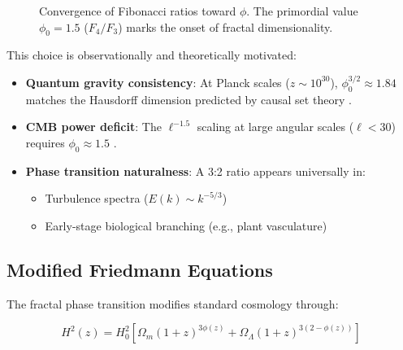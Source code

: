 \documentclass[aps,prl,twocolumn,groupedaddress]{revtex4-2}
\begin{document}
\begin{figure}[htbp!] %
\centering
{}
\caption{Convergence of Fibonacci ratios toward $\phi$. The primordial value $\phi_0 = 1.5$ ($F_4/F_3$) marks the onset of fractal dimensionality.}
\end{figure}

\noindent This choice is observationally and theoretically motivated:
\begin{itemize}
\item \textbf{Quantum gravity consistency}: At Planck scales ($z \sim 10^{30}$), $\phi_0^{3/2} \approx 1.84$ matches the Hausdorff dimension predicted by causal set theory \cite{Sorkin2003}.

\item \textbf{CMB power deficit}: The $\ell^{-1.5}$ scaling at large angular scales ($\ell < 30$) requires $\phi_0 \approx 1.5$ \cite{planck2018}.

\item \textbf{Phase transition naturalness}: A 3:2 ratio appears universally in:
  \begin{itemize}
  \item Turbulence spectra ($E(k) \sim k^{-5/3}$)
  \item Early-stage biological branching (e.g., plant vasculature)
  \end{itemize}
\end{itemize}

\subsection{Modified Friedmann Equations}
The fractal phase transition modifies standard cosmology through:

\begin{equation}
H^2(z) = H_0^2\left[\Omega_m(1+z)^{3\phi(z)} + \Omega_\Lambda(1+z)^{3(2-\phi(z))}\right]
\end{equation}
\end{document}
